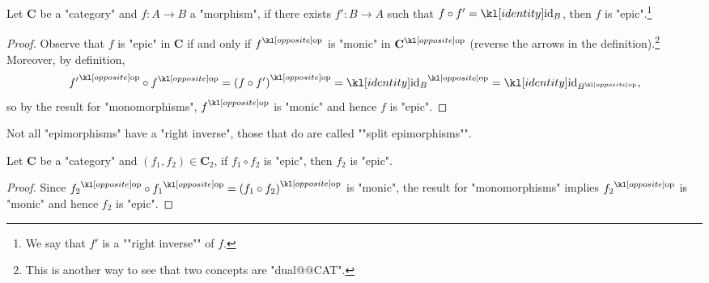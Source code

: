 \documentclass[main.tex]{subfiles}
\begin{document}
\begin{prop}\label{prop:ep1}
	Let $\mathbf{C}$ be a "category" and $f:A\rightarrow B$ a "morphism", if there exists $f': B\rightarrow A$ such that $f\circ f' = \id_B$, then $f$ is "epic".\footnote{\AP We say that $f'$ is a ""right inverse"" of $f$.}
\end{prop}
\begin{proof}
	Observe that $f$ is "epic" in $\mathbf{C}$ if and only if $\op{f}$ is "monic" in $\op{\mathbf{C}}$ (reverse the arrows in the definition).\footnote{This is another way to see that two concepts are "dual@@CAT".} Moreover, by definition, \[\op{f'} \circ \op{f} = \op{(f \circ f')} = \op{\id_B} = \id_{\op{B}},\] so by the result for "monomorphisms", $\op{f}$ is "monic" and hence $f$ is "epic". 
\end{proof}
\AP Not all "epimorphisms" have a "right inverse", those that do are called ""split epimorphisms"".
\begin{prop}
	Let $\mathbf{C}$ be a "category" and $(f_1, f_2) \in \mathbf{C}_2$, if $f_1 \circ f_2$ is "epic", then $f_2$ is "epic".
\end{prop}
\begin{proof}
	Since $\op{f_2} \circ \op{f_1} = \op{(f_1 \circ f_2)}$ is "monic", the result for "monomorphisms" implies $\op{f_2}$ is "monic" and hence $f_2$ is "epic".
\end{proof}
\end{document}
